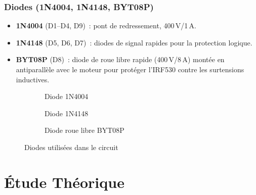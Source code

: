 \documentclass[a4paper,12pt,openany]{book}
\begin{document}
\subsection{Diodes (1N4004, 1N4148, BYT08P)}

\begin{itemize}
  \item \textbf{1N4004} (D1--D4, D9)~: pont de redressement, 400\,V/1\,A.
  \item \textbf{1N4148} (D5, D6, D7)~: diodes de signal rapides pour la
        protection logique.
  \item \textbf{BYT08P} (D8)~: diode de roue libre rapide (400\,V/8\,A)
        mont\'ee en antiparall\`ele avec le moteur pour prot\'eger l'IRF530
        contre les surtensions inductives.
\end{itemize}

\begin{figure}[H]
  \centering
  \begin{subfigure}[b]{0.30\textwidth}
    \centering
    \caption{Diode 1N4004}
  \end{subfigure}
  \hfill
  \begin{subfigure}[b]{0.30\textwidth}
    \centering
    \caption{Diode 1N4148}
  \end{subfigure}
  \hfill
  \begin{subfigure}[b]{0.30\textwidth}
    \centering
    \caption{Diode roue libre BYT08P}
  \end{subfigure}
  \caption{Diodes utilis\'ees dans le circuit}
  \label{fig:diodes}
\end{figure}

\chapter{\'Etude Th\'eorique}
\end{document}
